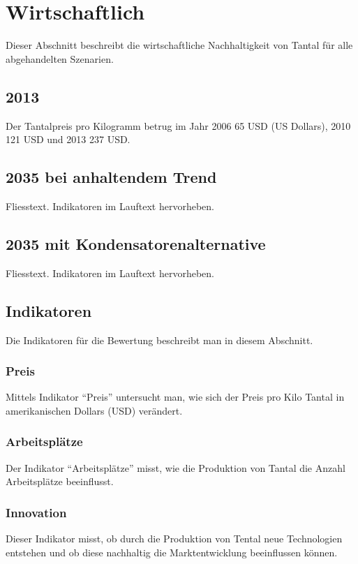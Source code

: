 
\section{Wirtschaftlich}\label{sec:conflict}
Dieser Abschnitt beschreibt die wirtschaftliche Nachhaltigkeit von Tantal für alle abgehandelten Szenarien.


\subsection{2013}
Der Tantalpreis pro Kilogramm betrug im Jahr 2006 65 USD (US Dollars), 2010 121 USD und 2013 237 USD.


\subsection{2035 bei anhaltendem Trend}
Fliesstext. Indikatoren im Lauftext hervorheben.

\subsection{2035 mit Kondensatorenalternative}
Fliesstext. Indikatoren im Lauftext hervorheben.

\iffalse
\subsection{Indikatoren}
Die Indikatoren für die Bewertung beschreibt man in diesem Abschnitt.

\subsubsection{Preis}
Mittels Indikator ``Preis'' untersucht man, wie sich der Preis pro Kilo Tantal
in amerikanischen Dollars (USD) verändert.

\subsubsection{Arbeitsplätze}
Der Indikator ``Arbeitsplätze'' misst, wie die Produktion von Tantal die Anzahl
Arbeitsplätze beeinflusst.

\subsubsection{Innovation}
Dieser Indikator misst, ob durch die Produktion von Tental neue Technologien
entstehen und ob diese nachhaltig die Marktentwicklung beeinflussen können.

